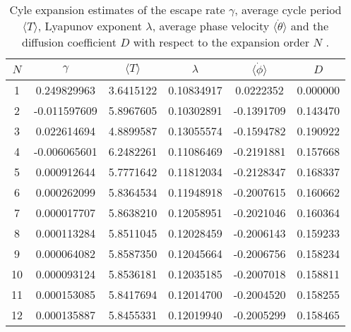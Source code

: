 \begin{table}
    \begin{tabular}{c|c|c|c|c|c}
     $N$ & $\gamma$ & $\langle T \rangle$ & $\lambda$ & $\langle \dot{\phi} \rangle$ & $D$ \\ 
    \hline
    1 & 0.249829963 & 3.6415122 & 0.10834917 & 0.0222352 & 0.000000 \\ 
    2 & -0.011597609 & 5.8967605 & 0.10302891 & -0.1391709 & 0.143470 \\ 
    3 & 0.022614694 & 4.8899587 & 0.13055574 & -0.1594782 & 0.190922 \\ 
    4 & -0.006065601 & 6.2482261 & 0.11086469 & -0.2191881 & 0.157668 \\ 
    5 & 0.000912644 & 5.7771642 & 0.11812034 & -0.2128347 & 0.168337 \\ 
    6 & 0.000262099 & 5.8364534 & 0.11948918 & -0.2007615 & 0.160662 \\ 
    7 & 0.000017707 & 5.8638210 & 0.12058951 & -0.2021046 & 0.160364 \\ 
    8 & 0.000113284 & 5.8511045 & 0.12028459 & -0.2006143 & 0.159233 \\ 
    9 & 0.000064082 & 5.8587350 & 0.12045664 & -0.2006756 & 0.158234 \\ 
    10 & 0.000093124 & 5.8536181 & 0.12035185 & -0.2007018 & 0.158811 \\ 
    11 & 0.000153085 & 5.8417694 & 0.12014700 & -0.2004520 & 0.158255 \\ 
    12 & 0.000135887 & 5.8455331 & 0.12019940 & -0.2005299 & 0.158465 \\ 
    \end{tabular}
    \caption{Cyle expansion estimates of the escape rate $\gamma$, average 
    cycle period $\langle T \rangle$, Lyapunov exponent $\lambda$, average 
    phase velocity $\langle \dot{\theta} \rangle$ and the diffusion coefficient 
    $D$ with respect to the expansion order $N$ .}
    \label{t-DynamicalAveragesNoGrammar}
\end{table}
